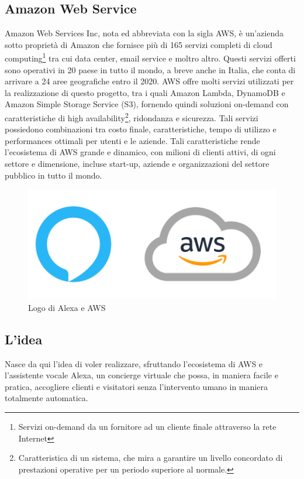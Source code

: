 \subsection{Amazon Web Service}
Amazon Web Services Inc, nota ed abbreviata con la sigla AWS, è un'azienda sotto proprietà di Amazon che fornisce più di 165 servizi completi di cloud computing\footnote{Servizi on-demand da un fornitore ad un cliente finale attraverso la rete Internet} tra cui data center, email service e moltro altro. Questi servizi offerti sono operativi in 20 paese in tutto il mondo, a breve anche in Italia, che conta di arrivare a 24 aree geografiche entro il 2020. AWS offre molti servizi utilizzati per la realizzazione di questo progetto, tra i quali Amazon Lambda, DynamoDB e Amazon Simple Storage Service (S3), fornendo quindi soluzioni on-demand con caratteristiche di high availability\footnote{Caratteristica di un sistema, che mira a garantire un livello concordato di prestazioni operative per un periodo superiore al normale.}, ridondanza e sicurezza. Tali servizi possiedono combinazioni tra costo finale, caratteristiche, tempo di utilizzo e performances ottimali per utenti e le aziende. Tali caratteristiche rende l'ecosistema di AWS grande e dinamico, con milioni di clienti attivi, di ogni settore e dimensione, incluse start-up, aziende e organizzazioni del settore pubblico in tutto il mondo.
\begin{figure}[H] 
    \centering 
    \includegraphics[width=0.8\columnwidth]{immagini/alexa_awspng.png}
    \caption{\label{fig:alexa_aws}Logo di Alexa e AWS}
\end{figure}

\subsection{L'idea}
Nasce da qui l'idea di voler realizzare, sfruttando l'ecosistema di AWS e l'assistente vocale Alexa, un concierge virtuale che possa, in maniera facile e pratica, accogliere clienti e visitatori senza l'intervento umano in maniera totalmente automatica.

